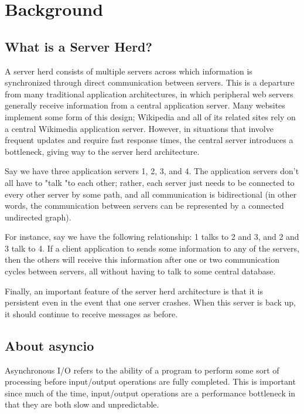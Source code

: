 \section{Background}

\subsection{What is a Server Herd?}
A server herd consists of multiple servers across which information is synchronized through direct communication between servers. 
This is a departure from many traditional application
architectures, in which peripheral web servers generally receive information from a central application server. Many websites implement
some form of this design; Wikipedia and all of its related sites rely on a central Wikimedia application server. However, 
in situations that involve frequent updates and require fast response times, the central server introduces a bottleneck, giving way to the 
server herd architecture. 

Say we have three application servers 1, 2, 3, and 4. The application servers don't all have to "talk "to each other; rather, each server just needs
to be connected to every other server by some path, and all communication is bidirectional 
(in other words, the communication between servers can be represented by a connected undirected graph). 

For instance, say we have the following relationship: 1 talks to 2 and 3, and 
2 and 3 talk to 4. If a client application to sends some information to any of the servers, then the others will receive this information after one or two 
communication cycles between servers, all without having to talk to some central database. 

Finally, an important feature of the server herd architecture is that it is persistent even in the event that one server crashes. When this server 
is back up, it should continue to receive messages as before.

\subsection{About asyncio}
Asynchronous I/O refers to the ability of a program to perform some sort of processing before input/output operations are fully completed. This is important since 
much of the time, input/output operations are a performance bottleneck in that they are both slow and unpredictable. 

